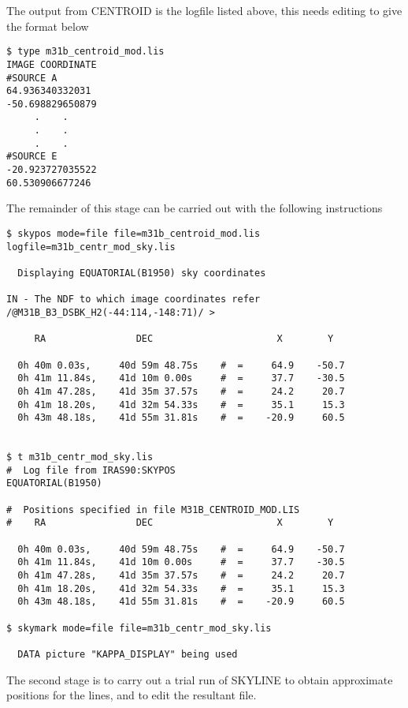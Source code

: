 \documentclass[twoside,11pt]{article}
\begin{document}
The output from CENTROID is the logfile listed above, this needs editing to give
the format below
\begin{small}
\begin{verbatim}
$ type m31b_centroid_mod.lis
IMAGE COORDINATE
#SOURCE A
64.936340332031
-50.698829650879  
     .    .
     .    .
     .    .
#SOURCE E
-20.923727035522
60.530906677246  
\end{verbatim}
\end{small}
The remainder of this stage can be carried out with the following instructions
\begin{small}
\begin{verbatim}
$ skypos mode=file file=m31b_centroid_mod.lis logfile=m31b_centr_mod_sky.lis

  Displaying EQUATORIAL(B1950) sky coordinates

IN - The NDF to which image coordinates refer /@M31B_B3_DSBK_H2(-44:114,-148:71)/ > 

     RA                DEC                      X        Y

  0h 40m 0.03s,     40d 59m 48.75s    #  =     64.9    -50.7
  0h 41m 11.84s,    41d 10m 0.00s     #  =     37.7    -30.5
  0h 41m 47.28s,    41d 35m 37.57s    #  =     24.2     20.7
  0h 41m 18.20s,    41d 32m 54.33s    #  =     35.1     15.3
  0h 43m 48.18s,    41d 55m 31.81s    #  =    -20.9     60.5


$ t m31b_centr_mod_sky.lis
#  Log file from IRAS90:SKYPOS
EQUATORIAL(B1950)        
 
#  Positions specified in file M31B_CENTROID_MOD.LIS
#    RA                DEC                      X        Y 
 
  0h 40m 0.03s,     40d 59m 48.75s    #  =     64.9    -50.7 
  0h 41m 11.84s,    41d 10m 0.00s     #  =     37.7    -30.5 
  0h 41m 47.28s,    41d 35m 37.57s    #  =     24.2     20.7 
  0h 41m 18.20s,    41d 32m 54.33s    #  =     35.1     15.3 
  0h 43m 48.18s,    41d 55m 31.81s    #  =    -20.9     60.5 

$ skymark mode=file file=m31b_centr_mod_sky.lis

  DATA picture "KAPPA_DISPLAY" being used
\end{verbatim}
\end{small}

The second stage is to carry out a trial run of SKYLINE to obtain approximate
positions for the lines, and to edit the resultant file. 
\end{document}
